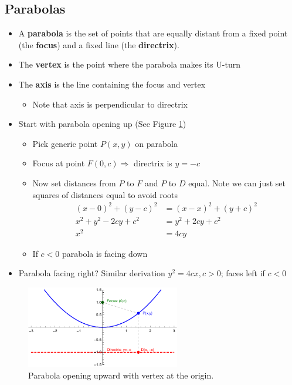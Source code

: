\documentclass[letterpaper, 11pt, openany]{book}
\theoremstyle{mytheoremstyle}
\theoremstyle{myexamplestyle}
\begin{document}
\subsection{Parabolas}
\begin{itemize}
    \item A \textbf{parabola} is the set of points that are equally distant from a fixed point (the \textbf{focus}) and a fixed line (the \textbf{directrix}).
    \item The \textbf{vertex} is the point where the parabola makes its U-turn
    \item The \textbf{axis} is the line containing the focus and vertex
    \begin{itemize}
        \item Note that axis is perpendicular to directrix
    \end{itemize}
    \item Start with parabola opening up (See Figure \ref{f:paraboladef})
    \begin{itemize}
        \item Pick generic point $P(x,y)$ on parabola
        \item Focus at point $F(0,c) \Rightarrow$ directrix is $y = -c$
        \item Now set distances from $P$ to $F$ and $P$ to $D$ equal. Note we can just set squares of distances equal to avoid roots \faSmile
        \begin{align*}
            (x-0)^{2} + (y-c)^{2} &= (x-x)^{2} + (y+c)^{2}\\
            x^{2} + y^{2} -2cy + c^{2} &= y^{2} + 2cy + c^{2}\\
            x^{2} &= 4cy
        \end{align*}
        \item If $c < 0$ parabola is facing down
    \end{itemize}
    \item Parabola facing right? Similar derivation $y^2 = 4cx, c > 0$; faces left if $c < 0$
\end{itemize}

\begin{figure}[htbp]
    \centering
        \includegraphics[width=0.6\textwidth]{Figures/paraboladef.pdf}
    \caption{Parabola opening upward with vertex at the origin.}
    \label{f:paraboladef}
\end{figure}
\end{document}
